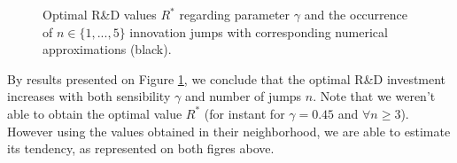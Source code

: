 \begin{figure}[!htb]
	\begin{subfigmatrix}{2}
	\end{subfigmatrix}
	\caption{Optimal R\&D values $R^*$ regarding parameter $\gamma$ and the occurrence of $n\in \{1,...,5\}$ innovation jumps with corresponding numerical approximations (black). }
	\label{fig:max_nR}
\end{figure}

By results presented on Figure \ref{fig:max_nR}, we conclude that the optimal R\&D investment increases with both sensibility $\gamma$ and number of jumps $n$. Note that we weren't able to obtain the optimal value $R^*$ (for instant for $\gamma=0.45$ and $\forall n\geq 3$). However using the values obtained in their neighborhood, we are able to estimate its tendency, as represented on both figres above.

